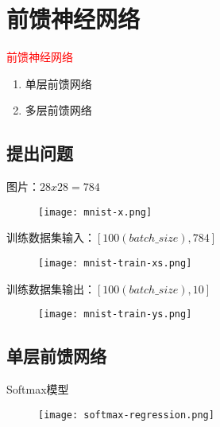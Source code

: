\section{前馈神经网络}
\label{sec:dnn}

\begin{frame}
  \begin{center}
    \Huge{\textcolor{red}{前馈神经网络}}
  \end{center}

  \begin{enumerate}
    \item \alert{单层前馈网络}
    \item \alert{多层前馈网络} 
  \end{enumerate}
\end{frame}

\subsection{提出问题}

\begin{frame}{图片：$ 28x28 = 784 $}
  \begin{figure}
    \centering
    \texttt{[image: mnist-x.png]}
  \end{figure}
\end{frame}

\begin{frame}{训练数据集输入：$ [100(batch\_size), 784] $}
  \begin{figure}
    \centering
    \texttt{[image: mnist-train-xs.png]}
  \end{figure}
\end{frame}

\begin{frame}{训练数据集输出：$ [100(batch\_size), 10] $}
  \begin{figure}
    \centering
    \texttt{[image: mnist-train-ys.png]}
  \end{figure}
\end{frame}

\subsection{单层前馈网络}

\begin{frame}[fragile]{Softmax模型}
  \begin{figure}
    \centering
    \texttt{[image: softmax-regression.png]}
  \end{figure}
\end{frame}

